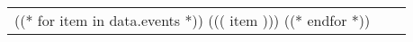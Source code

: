 \begin{tabular}{rll}
((* for item in data.events *))
((( item )))
((* endfor *))
\end{tabular}
\sectionsep